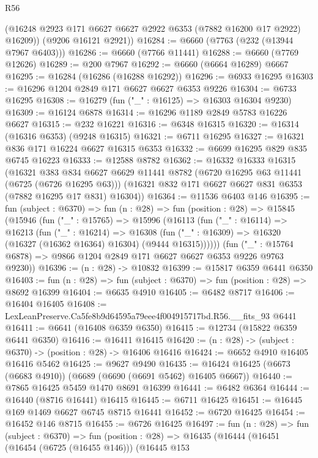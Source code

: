 \begin{lexlean}{R56}
\begin{coremodule}
        (@16248 @2923 @171 @6627 @6627 @2922 @6353 (@7882 @16200 @17 @2922) @16209))
      (@9206 @16121 @2921))
@16284 := @6660 (@7763 (@232 (@13944 @7967 @6403)))
@16286 := @6660 (@7766 @11441)
@16288 := @6660 (@7769 @12626)
@16289 := @200 @7967
@16292 := @6660 (@6664 @16289) @6667
@16295 := @16284 (@16286 (@16288 @16292))
@16296 := @6933 @16295
@16303 := @16296 @1204 @2849 @171 @6627 @6627 @6353 @9226
@16304 := @6733 @16295
@16308 := @16279 (fun ("_" : @16125) => @16303 @16304 @9230)
@16309 := @16124 @6878
@16314 := @16296 @1189 @2849 @5783 @16226 @6627
@16315 := @232 @16221
@16316 := @6348 @16315
@16320 := @16314 (@16316 @6353) (@9248 @16315)
@16321 := @6711 @16295
@16327 := @16321 @836 @171 @16224 @6627 @16315 @6353
@16332 := @6699 @16295 @829 @835 @6745 @16223
@16333 := @12588 @8782
@16362 := @16332
    @16333
    @16315
    (@16321
      @383
      @834
      @6627
      @6629
      @11441
      @8782
      (@6720 @16295 @63 @11441 (@6725 (@6726 @16295 @63)))
      (@16321 @832 @171 @6627 @6627 @831 @6353 (@7882 @16295 @17 @831) @16304))
@16364 := @11536 @6403 @146
@16395 := fun (subject : @6370) =>
  fun (n : @28) =>
  fun (position : @28) =>
  @15845
    (@15946
      (fun ("_" : @15765) =>
      @15996
        (@16113
          (fun ("_" : @16114) =>
          @16213
            (fun ("_" : @16214) =>
            @16308 (fun ("_" : @16309) => @16320 (@16327 (@16362 @16364) @16304) (@9444 @16315))))))
      (fun ("_" : @15764 @6878) => @9866 @1204 @2849 @171 @6627 @6627 @6353 @9226 @9763 @9230))
@16396 := (n : @28) -> @10832
@16399 := @15817 @6359 @6441 @6350
@16403 := fun (n : @28) => fun (subject : @6370) => fun (position : @28) => @8692 @16399
@16404 := @6635 @4910
@16405 := @6482 @8717
@16406 := @16404 @16405
@16408 := LexLeanPreserve.Ca5fe8b9d64595a79eee4f004915717bd.R56.__fits_93 @6441
@16411 := @6641 (@16408 @6359 @6350)
@16415 := @12734 (@15822 @6359 @6441 @6350)
@16416 := @16411 @16415
@16420 := (n : @28) -> (subject : @6370) -> (position : @28) -> @16406 @16416
@16424 := @6652 @4910 @16405 @16416 @5462
@16425 := @9627 @9490
@16435 := @16424 @16425 (@6673 (@6683 @4910)) (@6689 (@6690 (@6691 @5462) @16405 @6667))
@16440 := @7865 @16425 @5459 @1470 @8691 @16399
@16441 := @6482 @6364
@16444 := @16440 (@8716 @16441) @16415
@16445 := @6711 @16425
@16451 := @16445 @169 @1469 @6627 @6745 @8715 @16441
@16452 := @6720 @16425
@16454 := @16452 @146 @8715
@16455 := @6726 @16425
@16497 := fun (n : @28) =>
  fun (subject : @6370) =>
  fun (position : @28) =>
  @16435
    (@16444
      (@16451
        (@16454 (@6725 (@16455 @146)))
        (@16445
          @153

\end{coremodule}
\end{lexlean}
